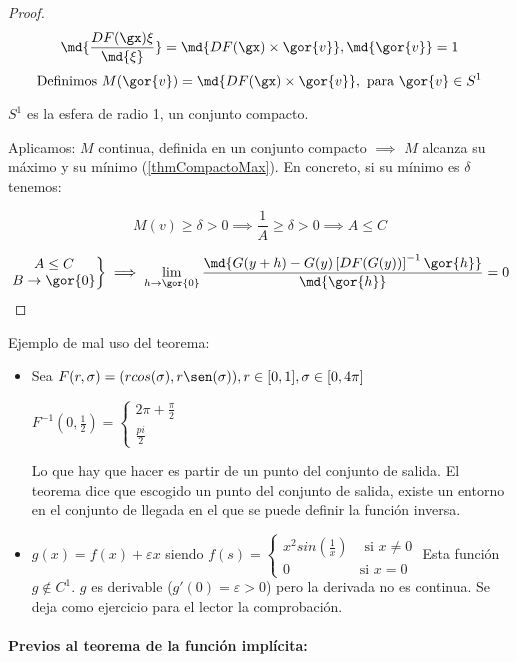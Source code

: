 \documentclass{apuntes}
\begin{document}
\begin{proof}
 
  $$\md{\frac{DF(\gx)\xi}{\md{\xi}}} = \md{DF(\gx)\times\gor{v}}, \md{\gor{v}} = 1$$
  $$\text{Definimos } M(\gor{v}) = \md{DF(\gx)\times\gor{v}}, \text{ para } \gor{v} \in S^1$$
  
  $S^1$ es la esfera de radio 1, un conjunto compacto.
  
  
  Aplicamos: $M$ continua, definida en un conjunto compacto $\implies$ $M$ alcanza su máximo y su mínimo (\ref{thmCompactoMax}). En concreto, si su mínimo es $\delta$ tenemos:
  
  $$ M(v)\geq \delta > 0 \implies \frac{1}{A}\geq \delta > 0 \implies A\leq C $$ 
  
  
  $$\left.\begin{matrix}A \leq C\\B \rightarrow \gor{0}\end{matrix}\right\} \implies \lim_{h \rightarrow \gor{0}}\frac{\md{G(y+h) - G(y) \left[DF(G(y))\right]^{-1} \gor{h}}}{\md{\gor{h}}} = 0$$
\end{proof}

Ejemplo de mal uso del teorema:
\begin{itemize}
 \item Sea $F (r,\sigma) = (rcos(\sigma),r\sen(\sigma)), r \in [0,1], \sigma \in [0,4\pi]$

$\displaystyle F^{-1} (0,\frac{1}{2}) = \left\{\begin{matrix}2\pi+\frac{\pi}{2}\\\frac{pi}{2}\end{matrix}\right.$

Lo que hay que hacer es partir de un punto del conjunto de salida. El teorema dice que escogido un punto del conjunto de salida, existe un entorno en el conjunto de llegada en el que se puede definir la función inversa.
\item $g(x) = f(x) + \varepsilon x$ siendo $f(s) =\left\{\begin{matrix}x^2sin\left(\frac{1}{x}\right)& \text{ si } x\neq0\\0 &\text{si } x=0\end{matrix}\right.$
Esta función $g \notin C^1$. $g$ es derivable ($g'(0) = \varepsilon>0$) pero la derivada no es continua. Se deja como ejercicio para el lector la comprobación.                                            
\end{itemize}


\paragraph{Previos al teorema de la función implícita:}
\end{document}
